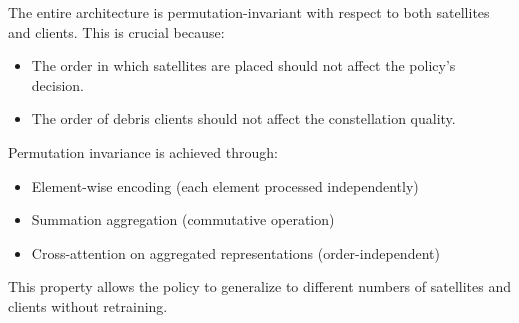 The entire architecture is permutation-invariant with respect to both satellites and clients. This is crucial because:
\begin{itemize}
    \item The order in which satellites are placed should not affect the policy's decision.
    \item The order of debris clients should not affect the constellation quality.
\end{itemize}

Permutation invariance is achieved through:
\begin{itemize}
    \item Element-wise encoding (each element processed independently)
    \item Summation aggregation (commutative operation)
    \item Cross-attention on aggregated representations (order-independent)
\end{itemize}

This property allows the policy to generalize to different numbers of satellites and clients without retraining.
